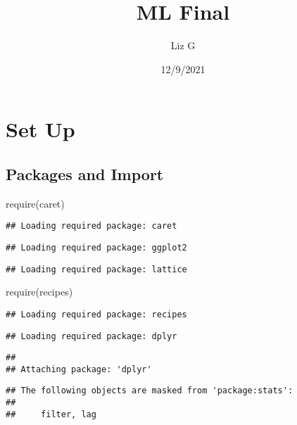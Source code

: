 \documentclass[
]{article}
\title{ML Final}
\author{Liz G}
\date{12/9/2021}
\newenvironment{Shaded}{\begin{snugshade}}{\end{snugshade}}
\newcommand{\FunctionTok}[1]{\textcolor[rgb]{0.00,0.00,0.00}{#1}}
\newcommand{\NormalTok}[1]{#1}
\begin{document}
\maketitle

{
\setcounter{tocdepth}{2}
\tableofcontents
}
\hypertarget{set-up}{%
\section{Set Up}\label{set-up}}

\hypertarget{packages-and-import}{%
\subsection{Packages and Import}\label{packages-and-import}}

\begin{Shaded}
\begin{Highlighting}[]
\FunctionTok{require}\NormalTok{(caret)}
\end{Highlighting}
\end{Shaded}

\begin{verbatim}
## Loading required package: caret
\end{verbatim}

\begin{verbatim}
## Loading required package: ggplot2
\end{verbatim}

\begin{verbatim}
## Loading required package: lattice
\end{verbatim}

\begin{Shaded}
\begin{Highlighting}[]
  \FunctionTok{require}\NormalTok{(recipes)}
\end{Highlighting}
\end{Shaded}

\begin{verbatim}
## Loading required package: recipes
\end{verbatim}

\begin{verbatim}
## Loading required package: dplyr
\end{verbatim}

\begin{verbatim}
## 
## Attaching package: 'dplyr'
\end{verbatim}

\begin{verbatim}
## The following objects are masked from 'package:stats':
## 
##     filter, lag
\end{verbatim}
\end{document}
